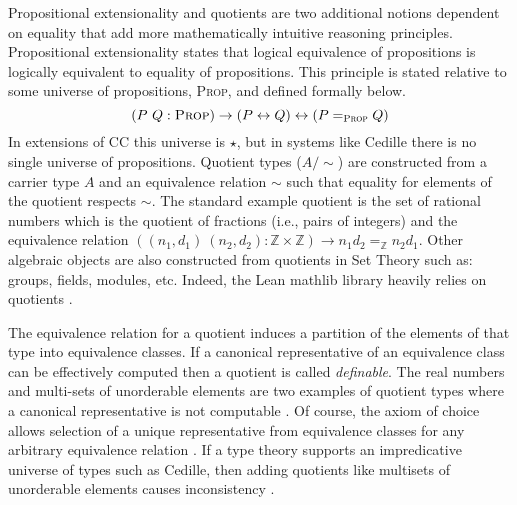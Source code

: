 Propositional extensionality and quotients are two additional notions dependent on equality that add more mathematically intuitive reasoning principles.
Propositional extensionality states that logical equivalence of propositions is logically equivalent to equality of propositions.
This principle is stated relative to some universe of propositions, \textsc{Prop}, and defined formally below.
$$(P\ Q : \textsc{Prop}) \to (P \leftrightarrow Q) \leftrightarrow (P =_\textsc{Prop} Q)$$
In extensions of CC this universe is $\star$, but in systems like Cedille there is no single universe of propositions.
Quotient types ($A/\!\!\sim$) are constructed from a carrier type $A$ and an equivalence relation $\sim$ such that equality for elements of the quotient respects $\sim$.
The standard example quotient is the set of rational numbers which is the quotient of fractions (i.e., pairs of integers) and the equivalence relation $((n_1, d_1)\ (n_2, d_2) : \mathbb{Z \times Z}) \to n_1d_2 =_{\mathbb{Z}} n_2d_1$.
Other algebraic objects are also constructed from quotients in Set Theory such as: groups, fields, modules, etc.
Indeed, the Lean mathlib library heavily relies on quotients \cite{mathlib}.

The equivalence relation for a quotient induces a partition of the elements of that type into equivalence classes.
If a canonical representative of an equivalence class can be effectively computed then a quotient is called \textit{definable}.
The real numbers and multi-sets of unorderable elements are two examples of quotient types where a canonical representative is not computable \cite{li2015}.
Of course, the axiom of choice allows selection of a unique representative from equivalence classes for any arbitrary equivalence relation \cite{lof2009}.
If a type theory supports an impredicative universe of types such as Cedille, then adding quotients like multisets of unorderable elements causes inconsistency \cite{chicli2002}.

